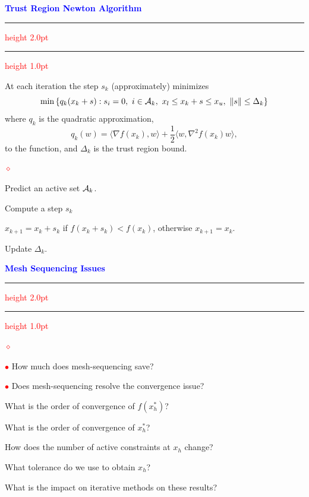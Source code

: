 \documentclass{seminar}
\newcommand{\grad}{\nabla}
\newcommand{\half}{{\textstyle{\frac{1}{2}}}}
\newcommand{\cA} {\mbox{$\cal A$}}
\newcommand{\redball}{\textcolor{red}{$\bullet$}}
\newcommand{\reddiamond}{\textcolor{red}{$\diamond$}}
\newcommand{\redstripe}{\textcolor{red}{\hrule height 2.0pt\hfil}
             \vspace{-1.8pt}
             \textcolor{red}{\hrule height 1.0pt\hfil}
}
\newcommand{\heading}[1]{%
   \centerline{\textcolor{blue}{\textbf{#1}}}%
    \redstripe%
    \bigskip
}
\begin{document}
\begin{slide}

\heading{Trust Region Newton Algorithm}

At each iteration the step $s_k$  (approximately) minimizes 
\[
\min 
\left \{ 
q_k ( x_k + s ) : s_i = 0, \ i \in \cA_k , \
x_l \le x_k + s \le x_u , \ \| s \| \le \Delta_k 
\right \}
\]
where $ q_k $ is the quadratic approximation,
\[
q_k (w) = \langle \grad f (x_k ) , w \rangle + 
\half \langle w , \grad ^2 f(x_k) w \rangle ,
\]
to the function, and $ \Delta_k $ is the trust region bound.
\medskip

\begin{list}{\reddiamond}
{
\setlength{\itemsep}{0pt}
\setlength{\parsep}{0pt}
}
\item
Predict an active set $ \cA_k $.
\item
Compute a step $ s_k $ 
\item
$ x_{k+1} = x_k + s_k $ if $ f (x_k + s_k ) < f (x_k) $, 
otherwise $ x_{k+1} = x_k $.
\item
Update $ \Delta_k $.
\end{list}

\vfill

\end{slide}

\begin{slide}

\heading{Mesh Sequencing Issues}

\begin{list}{\reddiamond}{}
\item[\redball]
How much does mesh-sequencing save?
\item[\redball]
Does mesh-sequencing resolve the convergence issue?
\item
What is the order of convergence of $ f ( x_h^*) $?
\item
What is the order of convergence of $ x_h^* $?
\item
How does the number of active constraints at $ x_h $ change?
\item
What tolerance do we use to obtain $ x_h $?
\item
What is the impact on iterative methods on these results?
\end{list}

\vfill

\end{slide}
\end{document}
